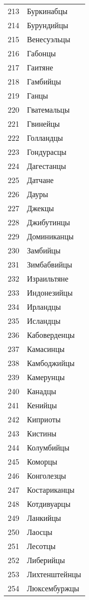 \documentclass[10pt, a4paper, titlepage]{article}
\begin{document}
\begin{xtabular}{rp{.38\textwidth}}
    213 & Буркинабцы \\
    214 & Бурундийцы \\
    215 & Венесуэльцы \\
    216 & Габонцы \\
    217 & Гаитяне \\
    218 & Гамбийцы \\
    219 & Ганцы \\
    220 & Гватемальцы \\
    221 & Гвинейцы \\
    222 & Голландцы \\
    223 & Гондурасцы \\
    224 & Дагестанцы \\
    225 & Датчане \\
    226 & Дауры \\
    227 & Джекцы \\
    228 & Джибутинцы \\
    229 & Доминиканцы \\
    230 & Замбийцы \\
    231 & Зимбабвийцы \\
    232 & Израильтяне \\
    233 & Индонезийцы \\
    234 & Ирландцы \\
    235 & Исландцы \\
    236 & Кабоверденцы \\
    237 & Камасинцы \\
    238 & Камбоджийцы \\
    239 & Камерунцы \\
    240 & Канадцы \\
    241 & Кенийцы \\
    242 & Киприоты \\
    243 & Кистины \\
    244 & Колумбийцы \\
    245 & Коморцы \\
    246 & Конголезцы \\
    247 & Костариканцы \\
    248 & Котдивуарцы \\
    249 & Ланкийцы \\
    250 & Лаосцы \\
    251 & Лесотцы \\
    252 & Либерийцы \\
    253 & Лихтенштейнцы \\
    254 & Люксембуржцы \\

\end{xtabular}
\end{document}

